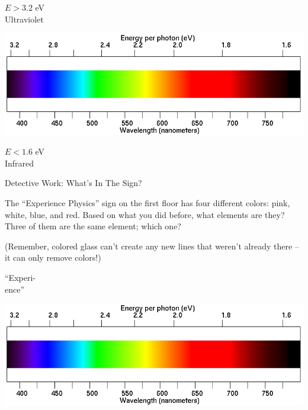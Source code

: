 \documentclass[12pt]{article}
\begin{document}
\begin{landscape}
\bigskip

\begin{minipage}{1in}
\large
$E > 3.2$ eV\\
Ultraviolet
\end{minipage}
\begin{minipage}{8in}
\includegraphics[width=\textwidth]{spectrum2.png}
\end{minipage}
\begin{minipage}{1in}
$E < 1.6$ eV\\
Infrared
\end{minipage}
\end{landscape}

\newpage

\begin{center}\Large Detective Work: What's In The Sign?\end{center}

The ``Experience Physics'' sign on the first floor has four different colors: pink, white, blue, and red. Based on what you
did before, what elements are they? Three of them are the same element; which one?

(Remember, colored glass can't create any new lines that weren't already there -- it can only remove colors!)

 \begin{minipage}{0.1\textwidth}
\begin{center}
``Experi-\\ence''
\end{center}
\end{minipage}
\begin{minipage}{0.8\textwidth}
\includegraphics[width=\textwidth]{spectrum2.png}
\end{minipage}
\end{document}
